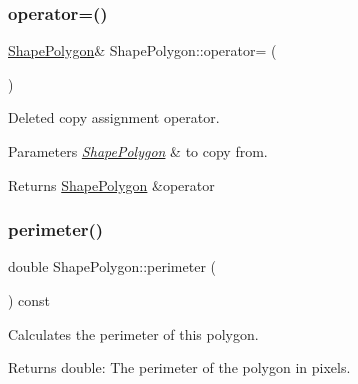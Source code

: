 \mbox{\label{class_shape_polygon_ae16e02c40d2c3e05aeba75613e38de12}} 
\subsubsection{\texorpdfstring{operator=()}{operator=()}}
{\footnotesize\ttfamily \mbox{\hyperlink{class_shape_polygon}{Shape\+Polygon}}\& Shape\+Polygon\+::operator= (\begin{DoxyParamCaption}\item[{const \mbox{\hyperlink{class_shape_polygon}{Shape\+Polygon}} \&}]{ }\end{DoxyParamCaption})\hspace{0.3cm}{\ttfamily [delete]}}



Deleted copy assignment operator. 


\begin{DoxyParams}{Parameters}
{\em \mbox{\hyperlink{class_shape_polygon}{Shape\+Polygon}}} & to copy from. \\
\hline
\end{DoxyParams}
\begin{DoxyReturn}{Returns}
\mbox{\hyperlink{class_shape_polygon}{Shape\+Polygon}} \&operator 
\end{DoxyReturn}
\mbox{\label{class_shape_polygon_acb81cc3272ad00038abd6f1a7a155b2e}} 
\subsubsection{\texorpdfstring{perimeter()}{perimeter()}}
{\footnotesize\ttfamily double Shape\+Polygon\+::perimeter (\begin{DoxyParamCaption}{ }\end{DoxyParamCaption}) const\hspace{0.3cm}{\ttfamily [virtual]}}



Calculates the perimeter of this polygon. 

\begin{DoxyReturn}{Returns}
double\+: The perimeter of the polygon in pixels. 
\end{DoxyReturn}


